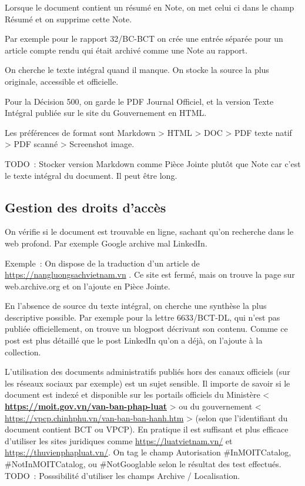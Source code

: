 \documentclass[a4paper,11pt]{report}
\begin{document}
Lorsque le document contient un résumé en Note, on met celui ci dans le champ Résumé et on supprime cette Note.

Par exemple pour le rapport 32/BC-BCT on crée une entrée séparée pour un article compte rendu qui était archivé comme une Note au rapport.

On cherche le texte intégral quand il manque. On stocke la source la plus originale, accessible et officielle.

Pour la Décision 500, on garde le PDF Journal Officiel, et la version Texte Intégral publiée sur le site du Gouvernement en HTML.

Les préférences de format sont Markdown \textgreater{} HTML \textgreater{} DOC \textgreater{} PDF texte natif \textgreater{} PDF scanné \textgreater{} Screenshot image.

TODO~: Stocker version Markdown comme Pièce Jointe plutôt que Note car c'est le texte intégral du document. Il peut être long.

\subsection{Gestion des droits d'accès}\label{gestion-des-droits-daccuxe8s}

On vérifie si le document est trouvable en ligne, sachant qu'on recherche dans le web profond. Par exemple Google archive mal LinkedIn.

Exemple~: On dispose de la traduction d'un article de \href{https://nangluongsachvietnam.vn/}{https://nangluongsachvietnam.vn} . Ce site est fermé, mais on trouve la page sur web.archive.org et on l'ajoute en Pièce Jointe.

En l'absence de source du texte intégral, on cherche une synthèse la plus descriptive possible. Par exemple pour la lettre 6633/BCT-DL, qui n'est pas publiée officiellement, on trouve un blogpost décrivant son contenu. Comme ce post est plus détaillé que le post LinkedIn qu'on a déjà, on l'ajoute à la collection.

L'utilisation des documents administratifs publiés hors des canaux officiels (sur les réseaux sociaux par exemple) est un sujet sensible. Il importe de savoir si le document est indexé et disponible sur les portails officiels du Ministère \textless{}\textbf{\textbf{ }}\href{https://moit.gov.vn/van-ban-phap-luat}{\textbf{\textbf{https://moit.gov.vn/van-ban-phap-luat}}}\textbf{\textbf{ }}\textgreater{} ou du gouvernement \textless{} \url{https://vpcp.chinhphu.vn/van-ban-ban-hanh.htm} \textgreater{} (selon que l'identifiant du document contient BCT ou VPCP). En pratique il est suffisant et plus efficace d'utiliser les sites juridiques comme \url{https://luatvietnam.vn/} et \url{https://thuvienphapluat.vn/}. On tag le champ Autorisation \#InMOITCatalog, \#NotInMOITCatalog, ou \#NotGooglable selon le résultat des test effectués. TODO~: Posssibilité d'utiliser les champs Archive / Localisation.
\end{document}
